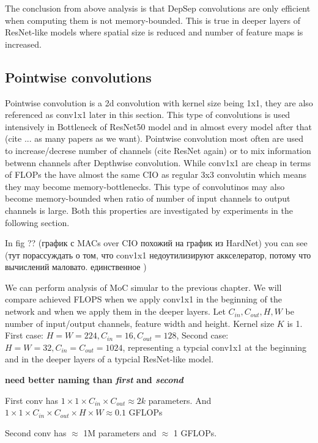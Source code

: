 The conclusion from above analysis is that DepSep convolutions are only efficient when computing them is not memory-bounded. This is true in deeper layers of ResNet-like models where spatial size is reduced and number of feature maps is increased. 

\subsection{Pointwise convolutions}

Pointwise convolution is a 2d convolution with kernel size being 1x1, they are also referenced as conv1x1 later in this section. This type of convolutions is used intensively in Bottleneck of ResNet50 model and in almost every model after that (cite ... as many papers as we want). Pointwise convolution most often are used to increase/decrese number of channels (cite ResNet again) or to mix information betwenn channels after Depthwise convolution. While conv1x1 are cheap in terms of FLOPs the have almost the same CIO as regular 3x3 convolutin which means they may become memory-bottlenecks. This type of convolutinos may also become memory-bounded when ratio of number of input channels to output channels is large. Both this properties are investigated by experiments in the following section.

In fig ?? (график с MACs over CIO похожий на график из HardNet) you can see 
(тут порассуждать о том, что conv1x1 недоутилизируют аккселератор, потому что вычислений маловато. единственное )

We can perform analysis of MoC simular to the previous chapter. We will compare achieved FLOPS when we apply conv1x1 in the beginning of the network and when we apply them in the deeper layers. Let $C_{in}, C_{out}, H, W$ be number of input/output channels, feature width and height. Kernel size $K$ is 1. First case: $H=W=224, C_{in} = 16, C_{out}=128$, Second case: $H=W=32, C_{in} = C_{out}=1024$, representing a typcial conv1x1 at the beginning and in the deeper layers of a typcial ResNet-like model.

\textbf{need better naming than \textit{first} and \textit{second}}

First conv has $ 1 \times 1 \times C_{in} \times C_{out} \approx 2k$ parameters. And $ 1 \times 1 \times C_{in} \times C_{out} \times H \times W \approx 0.1 $ GFLOPs

Second conv has $\approx$ 1M parameters and $\approx$ 1 GFLOPs. 

%

